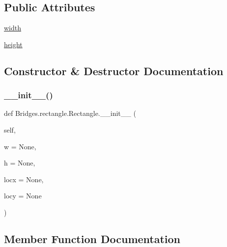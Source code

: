 \subsection*{Public Attributes}
\begin{DoxyCompactItemize}
\item 
\mbox{\hyperlink{class_bridges_1_1rectangle_1_1_rectangle_aaae9ea88bf002ce04c7a1b790d5e6426}{width}}
\item 
\mbox{\hyperlink{class_bridges_1_1rectangle_1_1_rectangle_a43de3ad0b917af8d8bb107e3113f6414}{height}}
\end{DoxyCompactItemize}


\subsection{Constructor \& Destructor Documentation}
\mbox{\label{class_bridges_1_1rectangle_1_1_rectangle_aac3556ec035b237c15365ff5a23206f3}} 
\subsubsection{\texorpdfstring{\+\_\+\+\_\+init\+\_\+\+\_\+()}{\_\_init\_\_()}}
{\footnotesize\ttfamily def Bridges.\+rectangle.\+Rectangle.\+\_\+\+\_\+init\+\_\+\+\_\+ (\begin{DoxyParamCaption}\item[{}]{self,  }\item[{}]{w = {\ttfamily None},  }\item[{}]{h = {\ttfamily None},  }\item[{}]{locx = {\ttfamily None},  }\item[{}]{locy = {\ttfamily None} }\end{DoxyParamCaption})}



\subsection{Member Function Documentation}
\mbox{\label{class_bridges_1_1rectangle_1_1_rectangle_a63c94bd3ac867e615755664e70020cac}} 
